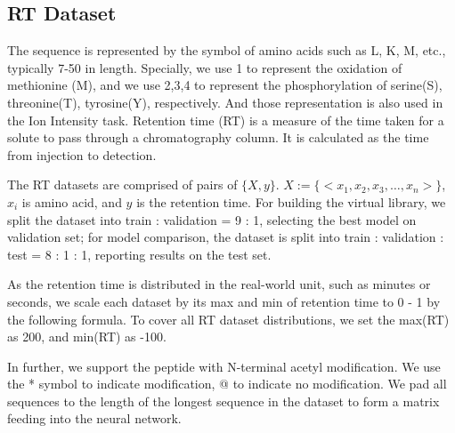 \subsection{RT Dataset}
The sequence is represented by the symbol of amino acids such as L, K, M, etc., typically 7-50 
in length. Specially, we use 1 to represent the oxidation of methionine (M), and we use 2,3,4 to represent the phosphorylation of serine(S), threonine(T), tyrosine(Y), respectively. And those representation is also used in the Ion Intensity task.
Retention time (RT) is a measure of the time taken for a solute to pass through a chromatography column.
It is calculated as the time from injection to detection. 

The RT datasets are comprised of pairs of 
\( \{X, y\} \). $X:= \{ <x_1, x_2, x_3,\dots, x_n> \}$, $x_i$ 
is amino acid,
and \( y \) is the retention time. For building the virtual library, we split the dataset into train : validation = 9 : 1, 
selecting the best model on validation set; for model comparison, the dataset is split into train : validation : test
= 8 : 1 : 1, reporting results on the test set.

As the retention time is distributed in the real-world unit, such as minutes or seconds, we scale each dataset by its max and min of retention time to 0 - 1 by the following formula. To cover all RT dataset distributions, we set the max(RT) as 200, and min(RT) as -100. 

In further, we support the peptide with N-terminal acetyl modification. We use the * symbol to indicate modification, @ to indicate no modification. We pad all sequences to the length of the longest sequence in the dataset to form a matrix feeding into the neural network. 

